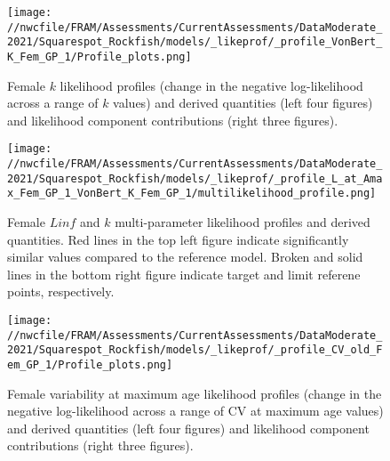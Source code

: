 \documentclass[11pt,
  english,
  a4paper,
]{article}
\begin{document}
\begin{figure}
\centering
\texttt{[image: //nwcfile/FRAM/Assessments/CurrentAssessments/DataModerate\_2021/Squarespot\_Rockfish/models/\_likeprof/\_profile\_VonBert\_K\_Fem\_GP\_1/Profile\_plots.png]}
\caption{Female {\(k\)\leavevmode\tagmcend\tagstructend} likelihood profiles (change in the negative log-likelihood across a range of {\(k\)\leavevmode\tagmcend\tagstructend} values) and derived quantities (left four figures) and likelihood component contributions (right three figures).\label{fig:k_f-profile-combo}}
\end{figure}

\tagmcend\tagstructend


\begin{figure}
\centering
\texttt{[image: //nwcfile/FRAM/Assessments/CurrentAssessments/DataModerate\_2021/Squarespot\_Rockfish/models/\_likeprof/\_profile\_L\_at\_Amax\_Fem\_GP\_1\_VonBert\_K\_Fem\_GP\_1/multilikelihood\_profile.png]}
\caption{Female {\(Linf\)\leavevmode\tagmcend\tagstructend} and {\(k\)\leavevmode\tagmcend\tagstructend} multi-parameter likelihood profiles and derived quantities. Red lines in the top left figure indicate significantly similar values compared to the reference model. Broken and solid lines in the bottom right figure indicate target and limit referene points, respectively.\label{fig:Linf_k_f-profile}}
\end{figure}

\tagmcend\tagstructend


\begin{figure}
\centering
\texttt{[image: //nwcfile/FRAM/Assessments/CurrentAssessments/DataModerate\_2021/Squarespot\_Rockfish/models/\_likeprof/\_profile\_CV\_old\_Fem\_GP\_1/Profile\_plots.png]}
\caption{Female variability at maximum age likelihood profiles (change in the negative log-likelihood across a range of CV at maximum age values) and derived quantities (left four figures) and likelihood component contributions (right three figures).\label{fig:CVold_f-profile-combo}}
\end{figure}
\end{document}
